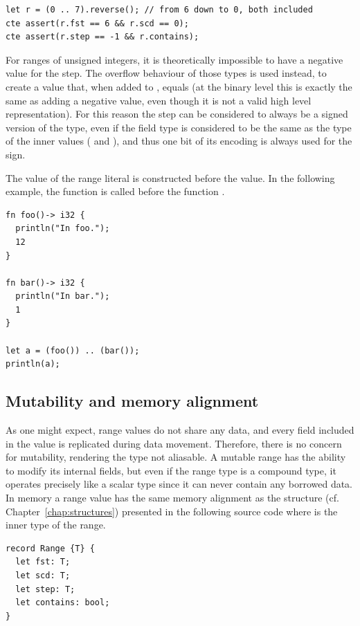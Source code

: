 \begin{lstlisting}[style=coloredverbatim]
let r = (0 .. 7).reverse(); // from 6 down to 0, both included
cte assert(r.fst == 6 && r.scd == 0);
cte assert(r.step == -1 && r.contains);
\end{lstlisting}

For ranges of unsigned integers, it is theoretically
impossible to have a negative value for the step. The overflow behaviour of
those types is used instead, to create a value that, when added to
, equals  (at the binary level this is
exactly the same as adding a negative value, even though it is not a valid high
level representation). For this reason the step can be
considered to always be a signed version of the type, even if the field
type is considered to be the same as the type of the inner values (
and ), and thus one bit of its encoding is always used for the sign.
\smallskip

The  value of the range literal is constructed before the
 value. In the following example, the function  is
called before the function .

\begin{lstlisting}[style=coloredverbatim]
fn foo()-> i32 {
  println("In foo.");
  12
}

fn bar()-> i32 {
  println("In bar.");
  1
}

let a = (foo()) .. (bar());
println(a);
\end{lstlisting}

\subsection{Mutability and memory alignment}

As one might expect, range values do not share any data, and every field
included in the value is replicated during data movement. Therefore, there is no
concern for mutability, rendering the type not aliasable. A mutable range has
the ability to modify its internal fields, but even if the range type is a
compound type, it operates precisely like a scalar type since it can never
contain any borrowed data. In memory a range value has the same memory
alignment as the structure (cf. Chapter~\ref{chap:structures}) presented in the
following source code where  is the inner type of the range.

\begin{lstlisting}[style=coloredverbatim]
record Range {T} {
  let fst: T;
  let scd: T;
  let step: T;
  let contains: bool;
}
\end{lstlisting}

